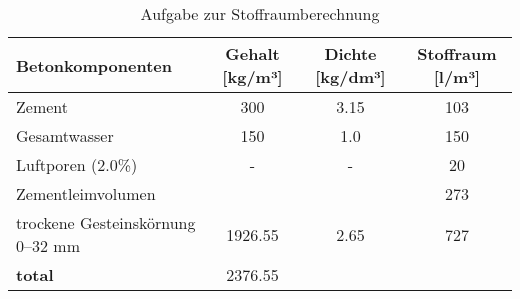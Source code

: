 \begin{questions}
\begin{solution}
\begin{table}[H]
                \caption{Aufgabe zur Stoffraumberechnung}
                \begin{tabularx}{\textwidth}{Xccc}
                \toprule
                \textbf{Betonkomponenten}       & \textbf{Gehalt [kg/m³]} & \textbf{Dichte [kg/dm³]} & \textbf{Stoffraum [l/m³]} \\ 
                \midrule
                Zement                           & 300                      & 3.15                       &    103          \\
                Gesamtwasser                     & 150                      & 1.0                       & 150            \\
                Luftporen (2.0\%)                & -                        & -                         & 20              \\
                Zementleimvolumen                &                          &                           &  273                         \\
                trockene Gesteinskörnung 0–32 mm & 1926.55                    & 2.65                       & 727            \\
                \textbf{total}                   & 2376.55           &            {}               & {}             \\
                \bottomrule
            \end{tabularx}
            \label{tab:Stoffraumberechnung2}
                \end{table}
            
        \end{solution}

\end{questions}





